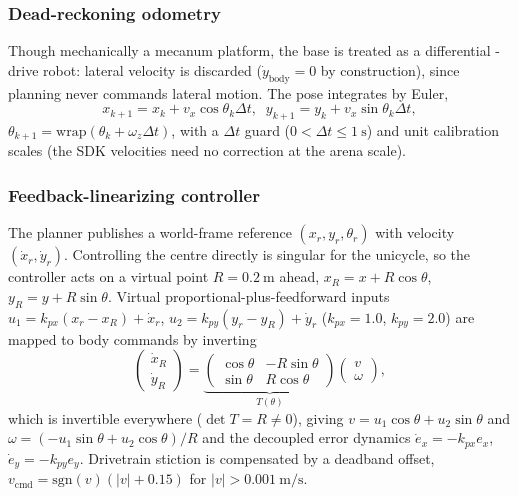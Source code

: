 \documentclass[conference]{IEEEtran}
\begin{document}
\subsubsection{Dead-reckoning odometry}
Though mechanically a mecanum platform, the base is treated as a differential
-drive robot: lateral velocity is discarded ($\dot{y}_\text{body}=0$ by
construction), since planning never commands lateral motion. The pose integrates
by Euler,
\begin{equation}
x_{k+1}=x_k+v_x\cos\theta_k\Delta t,\;\;
y_{k+1}=y_k+v_x\sin\theta_k\Delta t,
\end{equation}
$\theta_{k+1}=\mathrm{wrap}(\theta_k+\omega_z\Delta t)$, with a $\Delta t$ guard
($0<\Delta t\leq\SI{1}{\second}$) and unit calibration scales (the SDK velocities
need no correction at the arena scale).

\subsubsection{Feedback-linearizing controller}
The planner publishes a world-frame reference $(x_r,y_r,\theta_r)$ with velocity
$(\dot{x}_r,\dot{y}_r)$. Controlling the centre directly is singular for the
unicycle, so the controller acts on a virtual point $R=\SI{0.2}{\meter}$ ahead,
$x_R=x+R\cos\theta$, $y_R=y+R\sin\theta$. Virtual proportional-plus-feedforward
inputs $u_1=k_{px}(x_r-x_R)+\dot{x}_r$, $u_2=k_{py}(y_r-y_R)+\dot{y}_r$
($k_{px}=1.0$, $k_{py}=2.0$) are mapped to body commands by inverting
\begin{equation}
\begin{pmatrix}\dot{x}_R\\\dot{y}_R\end{pmatrix}=
\underbrace{\begin{pmatrix}\cos\theta&-R\sin\theta\\\sin\theta&R\cos\theta\end{pmatrix}}_{T(\theta)}
\begin{pmatrix}v\\\omega\end{pmatrix},
\end{equation}
which is invertible everywhere ($\det T=R\neq0$), giving
$v=u_1\cos\theta+u_2\sin\theta$ and $\omega=(-u_1\sin\theta+u_2\cos\theta)/R$ and
the decoupled error dynamics $\dot{e}_x=-k_{px}e_x$, $\dot{e}_y=-k_{py}e_y$.
Drivetrain stiction is compensated by a deadband offset,
$v_\text{cmd}=\mathrm{sgn}(v)(|v|+0.15)$ for $|v|>\SI{0.001}{\meter\per\second}$.
\end{document}
